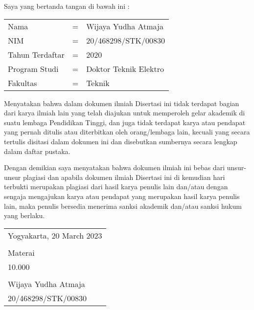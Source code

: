 \noindent Saya yang bertanda tangan di bawah ini :

\vspace*{-6pt}
{
\begin{longtable}{llp{340pt}}
	\hspace*{-6pt}Nama &=& Wijaya Yudha Atmaja\\
	\hspace*{-6pt}NIM &=& 20/468298/STK/00830\\
	\hspace*{-6pt}Tahun Terdaftar &=& 2020\\
	\hspace*{-6pt}Program Studi &=& Doktor Teknik Elektro\\
	\hspace*{-6pt}Fakultas &=& Teknik
\end{longtable}
}
\vspace*{-18pt}
\noindent Menyatakan bahwa dalam dokumen ilmiah Disertasi ini tidak terdapat bagian dari karya ilmiah lain yang telah diajukan untuk memperoleh gelar akademik di suatu lembaga Pendidikan Tinggi, dan juga tidak terdapat karya atau pendapat yang pernah ditulis atau diterbitkan oleh orang/lembaga lain, kecuali yang secara tertulis disitasi dalam dokumen ini dan disebutkan sumbernya secara lengkap dalam daftar pustaka.

\noindent Dengan demikian saya menyatakan bahwa dokumen ilmiah ini bebas dari unsur-unsur plagiasi dan apabila dokumen ilmiah Disertasi ini di kemudian hari terbukti merupakan plagiasi dari hasil karya penulis lain dan/atau dengan sengaja mengajukan karya atau pendapat yang merupakan hasil karya penulis lain, maka penulis bersedia menerima sanksi akademik dan/atau sanksi hukum yang berlaku.

\begin{flushright}
	\begin{tabular}{l}
		Yogyakarta, 20 March 2023 \\
		\vspace{1pt} \\[-20pt]
		Materai\\[-15pt] 10.000\\
		\vspace{1pt}\\[-20pt]
		Wijaya Yudha Atmaja \\[-10pt]
		20/468298/STK/00830
	\end{tabular}
\end{flushright}